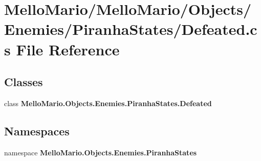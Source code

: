 \section{Mello\+Mario/\+Mello\+Mario/\+Objects/\+Enemies/\+Piranha\+States/\+Defeated.cs File Reference}
\label{PiranhaStates_2Defeated_8cs}
\subsection*{Classes}
\begin{DoxyCompactItemize}
\item 
class \textbf{ Mello\+Mario.\+Objects.\+Enemies.\+Piranha\+States.\+Defeated}
\end{DoxyCompactItemize}
\subsection*{Namespaces}
\begin{DoxyCompactItemize}
\item 
namespace \textbf{ Mello\+Mario.\+Objects.\+Enemies.\+Piranha\+States}
\end{DoxyCompactItemize}
